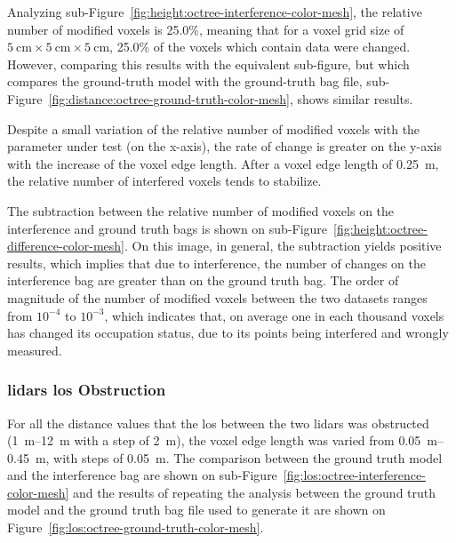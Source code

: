 Analyzing sub-Figure~\ref{fig:height:octree-interference-color-mesh}, the relative number of modified voxels is 25.0\%, meaning that for a voxel grid size of $\SI{5}{\centi\meter}\times \SI{5}{\centi\meter}\times \SI{5}{\centi\meter}$, 25.0\% of the voxels which contain data were changed. However, comparing this results with the equivalent sub-figure, but which compares the ground-truth model with the ground-truth bag file, sub-Figure~\ref{fig:distance:octree-ground-truth-color-mesh}, shows similar results.

Despite a small variation of the relative number of modified voxels with the parameter under test (on the x-axis), the rate of change is greater on the y-axis with the increase of the voxel edge length. After a voxel edge length of \SI{0.25}{\meter}, the relative number of interfered voxels tends to stabilize. 

The subtraction between the relative number of modified voxels on the interference and ground truth bags is shown on sub-Figure~\ref{fig:height:octree-difference-color-mesh}. On this image, in general, the subtraction yields positive results, which implies that due to interference, the number of changes on the interference bag are greater than on the ground truth bag. The order of magnitude of the number of modified voxels between the two datasets ranges from $10^{-4}$ to $10^{-3}$, which indicates that, on average one in each thousand voxels has changed its occupation status, due to its points being interfered and wrongly measured.


\subsubsection{\acp{lidar} \ac{los} Obstruction}
For all the distance values that the \acf{los} between the two \acp{lidar} was obstructed (\SIrange{1}{12}{\meter} with a step of \SI{2}{\meter}), the voxel edge length was varied from \SIrange{0.05}{0.45}{\meter}, with steps of \SI{0.05}{\meter}. The comparison between the ground truth model and the interference bag are shown on sub-Figure~\ref{fig:los:octree-interference-color-mesh} and the results of repeating the analysis between the ground truth model and the ground truth bag file used to generate it are shown on Figure~\ref{fig:los:octree-ground-truth-color-mesh}.


